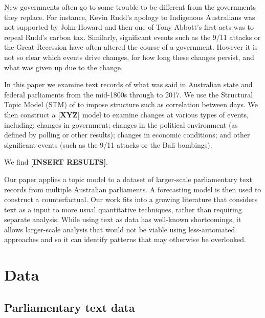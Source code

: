 \documentclass[12pt,]{article}
\begin{document}
New governments often go to some trouble to be different from the
governments they replace. For instance, Kevin Rudd's apology to
Indigenous Australians was not supported by John Howard and then one of
Tony Abbott's first acts was to repeal Rudd's carbon tax. Similarly,
significant events such as the 9/11 attacks or the Great Recession have
often altered the course of a government. However it is not so clear
which events drive changes, for how long these changes persist, and what
was given up due to the change.

In this paper we examine text records of what was said in Australian
state and federal parliaments from the mid-1800s through to 2017. We use
the Structural Topic Model (STM) of \citet{RobertsStewartAiroldi2016} to
impose structure such as correlation between days. We then construct a
\textbf{{[}XYZ{]}} model to examine changes at various types of events,
including: changes in government; changes in the political environment
(as defined by polling or other results); changes in economic
conditions; and other significant events (such as the 9/11 attacks or
the Bali bombings).

We find \textbf{{[}INSERT RESULTS{]}}.

Our paper applies a topic model to a dataset of larger-scale
parliamentary text records from multiple Australian parliaments. A
forecasting model is then used to construct a counterfactual. Our work
fits into a growing literature that considers text as a input to more
usual quantitative techniques, rather than requiring separate analysis.
While using text as data has well-known shortcomings, it allows
larger-scale analysis that would not be viable using less-automated
approaches and so it can identify patterns that may otherwise be
overlooked.

\section{Data}\label{data}

\subsection{Parliamentary text data}\label{parliamentary-text-data}
\end{document}
